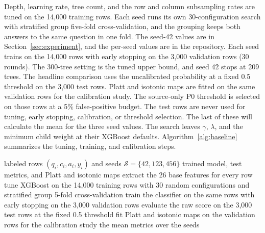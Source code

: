 \documentclass[a4paper,fleqn]{cas-sc}
\begin{document}
Depth, learning rate, tree count, and the row and column subsampling rates are tuned on the 14{,}000 training rows. Each seed runs its own 30-configuration search with stratified group five-fold cross-validation, and the grouping keeps both answers to the same question in one fold. The seed-42 values are in Section~\ref{sec:experiment}, and the per-seed values are in the repository. Each seed trains on the 14{,}000 rows with early stopping on the 3{,}000 validation rows (30 rounds). The 300-tree setting is the tuned upper bound, and seed 42 stops at 209 trees. The headline comparison uses the uncalibrated probability at a fixed 0.5 threshold on the 3{,}000 test rows. Platt and isotonic maps are fitted on the same validation rows for the calibration study. The source-only P0 threshold is selected on those rows at a 5\% false-positive budget. The test rows are never used for tuning, early stopping, calibration, or threshold selection. The last of these will calculate the mean for the three seed values. The search leaves $\gamma$, $\lambda$, and the minimum child weight at their XGBoost defaults. Algorithm~\ref{alg:baseline} summarizes the tuning, training, and calibration steps.

\begin{algorithm}[H]
  \caption{Baseline feature-based XGBoost (training and evaluation)}
  \label{alg:baseline}
  \begin{algorithmic}[1]
    \Require labeled rows $(q_i, c_i, a_i, y_i)$ and seeds $\mathcal{S} = \{42,123,456\}$
    \Ensure trained model, test metrics, and Platt and isotonic maps
    \State extract the 26 base features for every row
    \State tune XGBoost on the 14{,}000 training rows with 30 random configurations and stratified group 5-fold cross-validation
    \State train the classifier on the same rows with early stopping on the 3{,}000 validation rows
    \State evaluate the raw score on the 3{,}000 test rows at the fixed 0.5 threshold
    \State fit Platt and isotonic maps on the validation rows for the calibration study
    \EndFor
    \State \Return the mean metrics over the seeds
  \end{algorithmic}
\end{algorithm}
\end{document}

